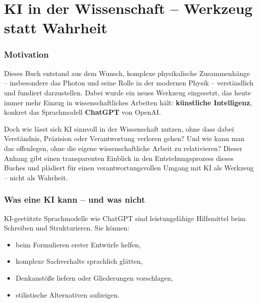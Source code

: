 

\renewcommand{\thesection}{\thechapter.\arabic{section}}
\renewcommand{\thechapter}{C}

\chapter{KI in der Wissenschaft – Werkzeug statt Wahrheit}


\label{anhangC:ki}


\subsection*{Motivation}
Dieses Buch entstand aus dem Wunsch, komplexe physikalische Zusammenhänge – insbesondere das Photon und seine Rolle in der modernen Physik – verständlich und fundiert darzustellen. Dabei wurde ein neues Werkzeug eingesetzt, das heute immer mehr Einzug in wissenschaftliches Arbeiten hält: \textbf{künstliche Intelligenz}, konkret das Sprachmodell \textbf{ChatGPT} von OpenAI.

Doch wie lässt sich KI sinnvoll in der Wissenschaft nutzen, ohne dass dabei Verständnis, Präzision oder Verantwortung verloren gehen? Und wie kann man das offenlegen, ohne die eigene wissenschaftliche Arbeit zu relativieren? Dieser Anhang gibt einen transparenten Einblick in den Entstehungsprozess dieses Buches und plädiert für einen verantwortungsvollen Umgang mit KI als Werkzeug – nicht als Wahrheit.

\subsection*{Was eine KI kann – und was nicht}
KI-gestützte Sprachmodelle wie ChatGPT sind leistungsfähige Hilfsmittel beim Schreiben und Strukturieren. Sie können:
\begin{itemize}
	\item beim Formulieren erster Entwürfe helfen,
	\item komplexe Sachverhalte sprachlich glätten,
	\item Denkanstöße liefern oder Gliederungen vorschlagen,
	\item stilistische Alternativen aufzeigen.
\end{itemize}

